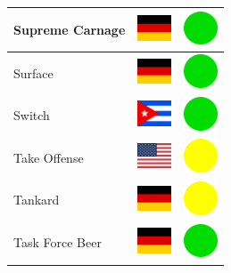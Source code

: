 \documentclass[12pt, a4paper, twoside]{report}
\begin{document}
\begin{center}
\begin{longtable}{|p{5cm}|p{2cm}|p{2cm}|}
Supreme Carnage & \includegraphics[width=1cm]{4x3/de} & \includegraphics[width=1cm]{likes/y} \\ \hline
Surface & \includegraphics[width=1cm]{4x3/de} & \includegraphics[width=1cm]{likes/y} \\ \hline
Switch & \includegraphics[width=1cm]{4x3/cu} & \includegraphics[width=1cm]{likes/y} \\ \hline
Take Offense & \includegraphics[width=1cm]{4x3/us} & \includegraphics[width=1cm]{likes/m} \\ \hline
Tankard & \includegraphics[width=1cm]{4x3/de} & \includegraphics[width=1cm]{likes/m} \\ \hline
Task Force Beer & \includegraphics[width=1cm]{4x3/de} & \includegraphics[width=1cm]{likes/y} \\ \hline

\end{longtable}
\end{center}
\end{document}
